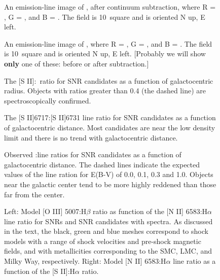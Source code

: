 \begin{figure}
\caption{An emission-line image of \gal, after continuum subtraction, where R = \ha, G = \sii, and B = \oiii.  The field is 10\arcmin\ square and is oriented N up, E left. }
\end{figure}

\begin{figure}
\caption{An emission-line image of \gal, where R = \ha, G = \sii, and B = \oiii.  The field is 10\arcmin\ square and is oriented N up, E left.  [Probably we will show {\bf only} one of these: before or after subtraction.] }
\end{figure}

\begin{figure}
\caption{The [S II]:\ha\ ratio for SNR candidates as a function of galactocentric radius.  Objects with ratios greater than 0.4 (the dashed line) are spectroscopically confirmed. \label{fig_s2_ha}}

\end{figure}

\begin{figure}
\caption{The [S II]6717:[S II]6731 line ratio for SNR candidates as a function of galactocentric distance.  Most candidates are near the low density limit and there is no trend with galactocentric distance.  \label{fig_s2_ratio}}
\end{figure}

\begin{figure}
\caption{Observed \hb:\ha line ratios for SNR candidates as a function of galactocentric distance. The dashed lines indicate the expected values of the line ration for E(B-V) of 0.0, 0.1, 0.3 and 1.0.  Objects near the galactic center tend to be more highly reddened than those far from the center. \label{fig_reddening}}
\end{figure}


\begin{figure}
\caption{Left: Model [O III] 5007:H$\beta$ ratio as function of the [N II] 6583:H$\alpha$ line ratio for SNRs and SNR candidates with spectra. As discussed in the text, the black, green and blue meshes correspond to shock models with a range of shock velocities and pre-shock magnetic fields, and with metallicities corresponding to the SMC, LMC, and Milky Way, respectively.  Right: Model [N II] 6583:H$\alpha$ line ratio as a function of  the [S II]:H$\alpha$ ratio. \label{fig_model}}
\end{figure}

